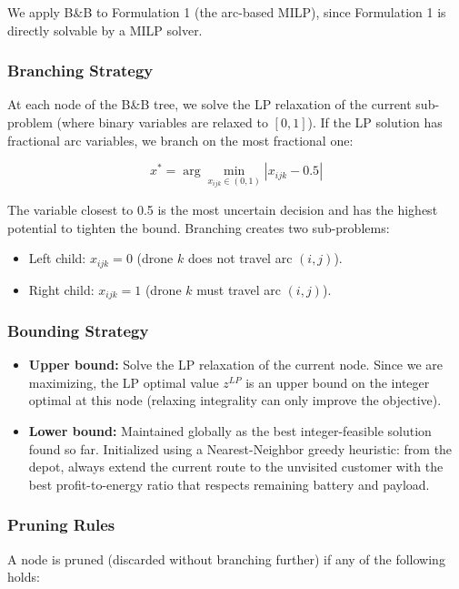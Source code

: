 \documentclass[12pt,a4paper]{article}
\begin{document}
We apply B\&B to Formulation 1 (the arc-based MILP), since Formulation 1 is directly
solvable by a MILP solver.

\subsubsection{Branching Strategy}

At each node of the B\&B tree, we solve the LP relaxation of the current sub-problem
(where binary variables are relaxed to $[0,1]$). If the LP solution has fractional arc
variables, we branch on the most fractional one:

\[
  x^* = \arg\min_{x_{ijk} \in (0,1)} \left| x_{ijk} - 0.5 \right|
\]

The variable closest to 0.5 is the most uncertain decision and has the highest
potential to tighten the bound. Branching creates two sub-problems:
\begin{itemize}
  \item Left child: $x_{ijk} = 0$ (drone $k$ does not travel arc $(i,j)$).
  \item Right child: $x_{ijk} = 1$ (drone $k$ must travel arc $(i,j)$).
\end{itemize}

\subsubsection{Bounding Strategy}

\begin{itemize}
  \item \textbf{Upper bound:} Solve the LP relaxation of the current node. Since we are
  maximizing, the LP optimal value $z^{LP}$ is an upper bound on the integer optimal
  at this node (relaxing integrality can only improve the objective).
  \item \textbf{Lower bound:} Maintained globally as the best integer-feasible solution
  found so far. Initialized using a Nearest-Neighbor greedy heuristic: from the depot,
  always extend the current route to the unvisited customer with the best
  profit-to-energy ratio that respects remaining battery and payload.
\end{itemize}

\subsubsection{Pruning Rules}

A node is pruned (discarded without branching further) if any of the following holds:
\end{document}
